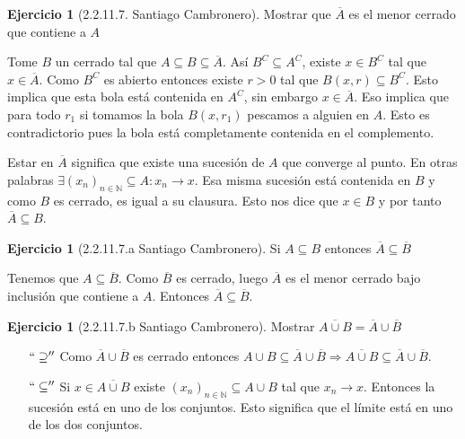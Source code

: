 \documentclass[12pt]{article}
\theoremstyle{plain}
\theoremstyle{definition}
\newtheorem{Ej}[Th]{Ejercicio}
\theoremstyle{remark}
\numberwithin{equation}{section}
\newcommand{\bN}{\mathbb{N}}        %
\renewcommand{\:}{\colon}           %
\begin{document}
\begin{multicols}{2}
\begin{Ej}[2.2.11.7. Santiago Cambronero]
  Mostrar que $\overline{A}$ es el menor cerrado que contiene a $A$
\end{Ej}
\begin{ptcb}
Tome $B$ un cerrado tal que $A\subseteq B\subseteq \overline{A}$. Así $B^C\subseteq A^C$, existe $x\in B^C$ tal que $x\in\overline{A}$. Como $B^C$ es abierto entonces existe $r>0$ tal que $B(x,r)\subseteq B^C$. Esto implica que esta bola está contenida en $A^C$, sin embargo $x\in\overline{A}$. Eso implica que para todo $r_1$ si tomamos la bola $B(x,r_1)$ pescamos a alguien en $A$. Esto es contradictorio pues la bola está completamente contenida en el complemento.
\end{ptcb}

\begin{ptcb}
Estar en $\overline{A}$ significa que existe una sucesión de $A$ que converge al punto. En otras palabras $\exists(x_n)_{n\in\bN}\subseteq A\colon x_n\to x$. Esa misma sucesión está contenida en $B$ y como $B$ es cerrado, es igual a su clausura. Esto nos dice que $x\in B$ y por tanto $\overline{A}\subseteq B$.
\end{ptcb}

\begin{Ej}[2.2.11.7.a Santiago Cambronero]
  Si $A\subseteq B$ entonces $\overline{A}\subseteq\overline{B}$
\end{Ej}

\begin{ptcb}
Tenemos que $A\subseteq \overline{B}$. Como $\overline{B}$ es cerrado, luego $\overline{A}$ es el menor cerrado bajo inclusión que contiene a $A$. Entonces $\overline{A}\subseteq \overline{B}$.
\end{ptcb}

\begin{Ej}[2.2.11.7.b Santiago Cambronero]
 Mostrar $\overline{A\cup B}=\overline{A}\cup\overline{B}$
\end{Ej}

\begin{ptcb}
\begin{enumerate}
  \item[$``\supseteq''$] Como $\overline{A}\cup\overline{B}$ es cerrado entonces $A\cup B\subseteq \overline{A}\cup\overline{B} \Rightarrow \overline{A\cup B}\subseteq \overline{A}\cup\overline{B}$.
  \item[$``\subseteq''$] Si $x\in\overline{A\cup B}$ existe $(x_n)_{n\in\bN}\subseteq A\cup B$ tal que $x_n\to x$. Entonces la sucesión está en uno de los conjuntos. Esto significa que el límite está en uno de los dos conjuntos.
\end{enumerate}
\end{ptcb}


\end{multicols}
\end{document}
